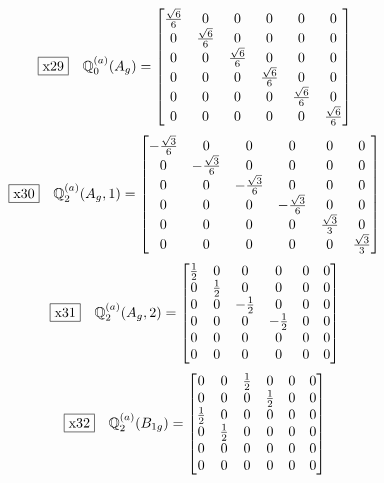 \documentclass[fleqn,10pt,landscape]{jsarticle}
\begin{document}
\begin{dmath*}
\fbox{x29}\quad \mathbb{Q}_{0}^{(a)}(A_{g})=\begin{bmatrix} \frac{\sqrt{6}}{6} & 0 & 0 & 0 & 0 & 0 \\ 0 & \frac{\sqrt{6}}{6} & 0 & 0 & 0 & 0 \\ 0 & 0 & \frac{\sqrt{6}}{6} & 0 & 0 & 0 \\ 0 & 0 & 0 & \frac{\sqrt{6}}{6} & 0 & 0 \\ 0 & 0 & 0 & 0 & \frac{\sqrt{6}}{6} & 0 \\ 0 & 0 & 0 & 0 & 0 & \frac{\sqrt{6}}{6} \end{bmatrix}
\end{dmath*}
\begin{dmath*}
\fbox{x30}\quad \mathbb{Q}_{2}^{(a)}(A_{g},1)=\begin{bmatrix} - \frac{\sqrt{3}}{6} & 0 & 0 & 0 & 0 & 0 \\ 0 & - \frac{\sqrt{3}}{6} & 0 & 0 & 0 & 0 \\ 0 & 0 & - \frac{\sqrt{3}}{6} & 0 & 0 & 0 \\ 0 & 0 & 0 & - \frac{\sqrt{3}}{6} & 0 & 0 \\ 0 & 0 & 0 & 0 & \frac{\sqrt{3}}{3} & 0 \\ 0 & 0 & 0 & 0 & 0 & \frac{\sqrt{3}}{3} \end{bmatrix}
\end{dmath*}
\begin{dmath*}
\fbox{x31}\quad \mathbb{Q}_{2}^{(a)}(A_{g},2)=\begin{bmatrix} \frac{1}{2} & 0 & 0 & 0 & 0 & 0 \\ 0 & \frac{1}{2} & 0 & 0 & 0 & 0 \\ 0 & 0 & - \frac{1}{2} & 0 & 0 & 0 \\ 0 & 0 & 0 & - \frac{1}{2} & 0 & 0 \\ 0 & 0 & 0 & 0 & 0 & 0 \\ 0 & 0 & 0 & 0 & 0 & 0 \end{bmatrix}
\end{dmath*}
\begin{dmath*}
\fbox{x32}\quad \mathbb{Q}_{2}^{(a)}(B_{1g})=\begin{bmatrix} 0 & 0 & \frac{1}{2} & 0 & 0 & 0 \\ 0 & 0 & 0 & \frac{1}{2} & 0 & 0 \\ \frac{1}{2} & 0 & 0 & 0 & 0 & 0 \\ 0 & \frac{1}{2} & 0 & 0 & 0 & 0 \\ 0 & 0 & 0 & 0 & 0 & 0 \\ 0 & 0 & 0 & 0 & 0 & 0 \end{bmatrix}
\end{dmath*}
\end{document}
